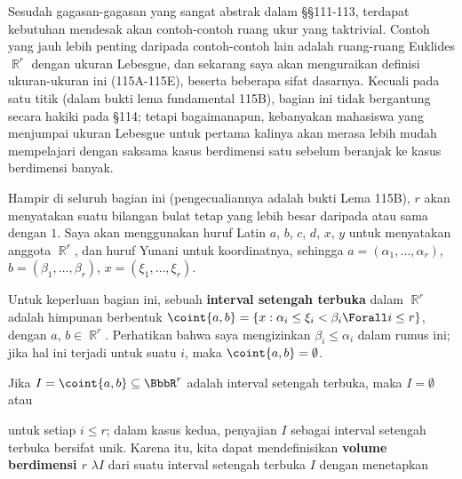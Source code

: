 
\def\chaptername{Ruang ukur}
\def\sectionname{Ukuran Lebesgue pada $\BbbR^r$}


\def\headlinesectionname{Ukuran Lebesgue pada $\eightBbb R^r$}

Sesudah gagasan-gagasan yang sangat abstrak dalam \S\S111-113, terdapat
kebutuhan mendesak akan contoh-contoh ruang ukur yang taktrivial. Contoh
yang jauh lebih penting daripada contoh-contoh lain adalah ruang-ruang
Euklides $\BbbR^r$ dengan ukuran Lebesgue, dan sekarang saya
akan menguraikan definisi ukuran-ukuran ini (115A-115E), beserta beberapa
sifat dasarnya. Kecuali pada satu titik (dalam bukti lema fundamental
115B), bagian ini tidak bergantung secara hakiki pada \S114; tetapi
bagaimanapun, kebanyakan mahasiswa yang menjumpai ukuran Lebesgue untuk
pertama kalinya akan merasa lebih mudah mempelajari dengan saksama kasus
berdimensi satu sebelum beranjak ke kasus berdimensi banyak.

 Hampir di seluruh bagian ini
(pengecualiannya adalah bukti Lema 115B), $r$ akan menyatakan suatu
bilangan bulat tetap yang lebih besar daripada atau sama dengan $1$.
Saya akan menggunakan huruf Latin $a$, $b$, $c$, $d$, $x$, $y$ untuk
menyatakan anggota $\BbbR^r$, dan huruf Yunani untuk koordinatnya,
sehingga $a=(\alpha_1,\ldots,\alpha_r)$,
$b=(\beta_1,\ldots,\beta_r)$, $x=(\xi_1,\ldots,\xi_r)$.

 Untuk keperluan bagian ini, sebuah {\bf
interval setengah terbuka} dalam $\BbbR^r$ adalah himpunan berbentuk
$\coint{a,b}=\{x:\alpha_i\le \xi_i<\beta_i\Forall i\le
r\}$, dengan $a$, $b\in\BbbR^r$.
Perhatikan bahwa saya mengizinkan $\beta_i\le \alpha_i$ dalam rumus ini;
jika hal ini terjadi untuk suatu $i$, maka $\coint{a,b}=\emptyset$.



 Jika $I=\coint{a,b}\subseteq \BbbR^r$ adalah
interval setengah terbuka, maka
$I=\emptyset$ atau


\noindent untuk setiap $i\le r$; dalam kasus kedua, penyajian $I$
sebagai interval setengah terbuka bersifat unik.
Karena itu, kita dapat mendefinisikan {\bf volume berdimensi $r$}
$\lambda I$ dari suatu interval setengah terbuka $I$ dengan menetapkan




